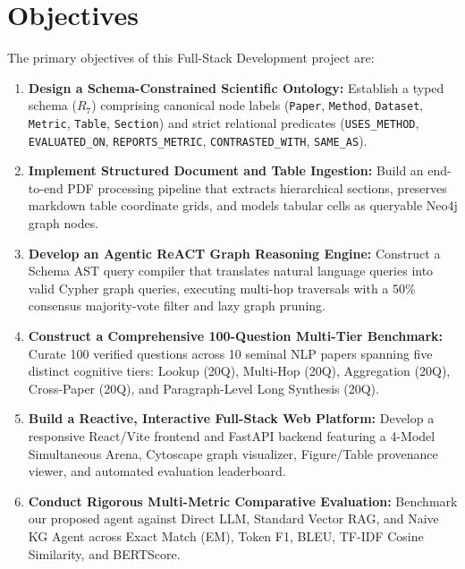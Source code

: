 \section{Objectives}
The primary objectives of this Full-Stack Development project are:
\begin{enumerate}
    \item \textbf{Design a Schema-Constrained Scientific Ontology:} Establish a typed schema ($R_7$) comprising canonical node labels (\texttt{Paper}, \texttt{Method}, \texttt{Dataset}, \texttt{Metric}, \texttt{Table}, \texttt{Section}) and strict relational predicates (\texttt{USES\_METHOD}, \texttt{EVALUATED\_ON}, \texttt{REPORTS\_METRIC}, \texttt{CONTRASTED\_WITH}, \texttt{SAME\_AS}).
    \item \textbf{Implement Structured Document and Table Ingestion:} Build an end-to-end PDF processing pipeline that extracts hierarchical sections, preserves markdown table coordinate grids, and models tabular cells as queryable Neo4j graph nodes.
    \item \textbf{Develop an Agentic ReACT Graph Reasoning Engine:} Construct a Schema AST query compiler that translates natural language queries into valid Cypher graph queries, executing multi-hop traversals with a 50\% consensus majority-vote filter and lazy graph pruning.
    \item \textbf{Construct a Comprehensive 100-Question Multi-Tier Benchmark:} Curate 100 verified questions across 10 seminal NLP papers spanning five distinct cognitive tiers: Lookup (20Q), Multi-Hop (20Q), Aggregation (20Q), Cross-Paper (20Q), and Paragraph-Level Long Synthesis (20Q).
    \item \textbf{Build a Reactive, Interactive Full-Stack Web Platform:} Develop a responsive React/Vite frontend and FastAPI backend featuring a 4-Model Simultaneous Arena, Cytoscape graph visualizer, Figure/Table provenance viewer, and automated evaluation leaderboard.
    \item \textbf{Conduct Rigorous Multi-Metric Comparative Evaluation:} Benchmark our proposed agent against Direct LLM, Standard Vector RAG, and Naive KG Agent across Exact Match (EM), Token F1, BLEU, TF-IDF Cosine Similarity, and BERTScore.
\end{enumerate}

